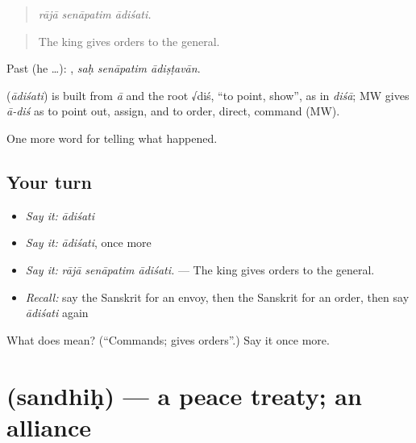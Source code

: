 \begin{quote}
  
\end{quote}

\begin{quote}
\emph{rājā senāpatim ādiśati.}
\end{quote}

\begin{quote}
The king gives orders to the general.
\end{quote}

Past (he …):   , \emph{saḥ senāpatim ādiṣṭavān}.

\begin{cousinweb}
\textbf{} (\emph{ādiśati}) is built from \emph{ā} and the root √diś, \textquotedblleft{}to point, show\textquotedblright{}, as in \emph{diśā}; MW gives \emph{ā-diś} as to point out, assign, and to order, direct, command (MW).
\end{cousinweb}

\begin{grammarlens}[title={What you've built}]
One more word for telling what happened.
\end{grammarlens}

\subsection*{Your turn}
\begin{itemize}
\raggedright
  \item \emph{Say it:} \emph{ādiśati}
  \item \emph{Say it:} \emph{ādiśati}, once more
  \item \emph{Say it:} \emph{rājā senāpatim ādiśati.} — The king gives orders to the general.
  \item \emph{Recall:} say the Sanskrit for an envoy, then the Sanskrit for an order, then say \emph{ādiśati} again
\end{itemize}

\begin{tcolorbox}[breakable,colback=teal!4,colframe=teal!35!black,title={Before you move on}]
What does  mean? (\textquotedblleft{}Commands; gives orders\textquotedblright{}.) Say it once more.
\end{tcolorbox}
\section[\texorpdfstring{\sk{सन्धिः} (sandhiḥ)}{सन्धिः (sandhiḥ)}]{ (sandhiḥ) — a peace treaty; an alliance}

